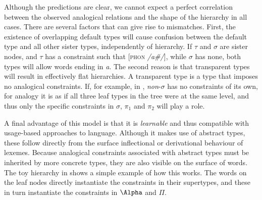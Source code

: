 Although the predictions are clear, we cannot expect a perfect correlation between the observed analogical relations and the shape of the hierarchy in all cases. There are several factors that can give rise to mismatches. First, the existence of overlapping default types will cause confusion between the default type and all other sister types, independently of hierarchy. If $\tau$ and $\sigma$ are sister nodes, and $\tau$ has a constraint such that [\textsc{phon} \textit{/a\#/}], while $\sigma$ has none, both types will allow words ending in \textit{a}. The second reason is that transparent types will result in effectively flat hierarchies. A transparent type is a type that imposes no analogical constraints. If, for example, in , \textit{non}-$\sigma$ has no constraints of its own, for analogy it is as if all three leaf types in the tree were at the same level, and thus only the specific constraints in $\sigma$, $\pi_1$ and $\pi_2$ will play a role.

A final advantage of this model is that it is \textit{learnable} and thus compatible with usage-based approaches to language. Although it makes use of abstract types, these follow directly from the surface inflectional or derivational behaviour of lexemes. Because analogical constraints associated with abstract types must be inherited by more concrete types, they are also visible on the surface of words. The toy hierarchy in  shows a simple example of how this works. The words on the leaf nodes directly instantiate the constraints in their supertypes, and these in turn instantiate the constraints in $\Alpha$ and $\Pi$.

